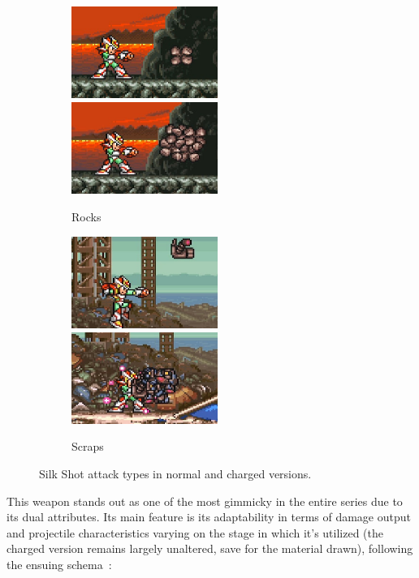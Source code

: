 \begin{figure}
	\ContinuedFloat
	\centering
	\begin{subfigure}{\linewidth}
		\centering
		\includegraphics[height=3cm]{figures/X2/weapons/S_shot_5.png}	
		\includegraphics[height=3cm]{figures/X2/weapons/S_shot_6.png}	
		\caption{Rocks}	
	\end{subfigure}
	\begin{subfigure}{\linewidth}
		\centering
		\includegraphics[height=3cm]{figures/X2/weapons/S_shot_7.png}	
		\includegraphics[height=3cm]{figures/X2/weapons/S_shot_8.png}	
		\caption{Scraps}
	\end{subfigure}
	\caption{Silk Shot attack types in normal and charged versions.}
\end{figure}
This weapon stands out as one of the most gimmicky in the entire series due to its dual attributes. Its main feature is its adaptability in terms of damage output and projectile characteristics varying on the stage in which it's utilized (the charged version remains largely unaltered, save for the material drawn), following the ensuing schema~\cite{wiki:Silk_shot}:
